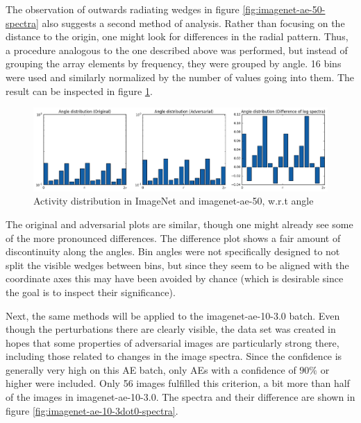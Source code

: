 \documentclass[11pt, a4paper]{article}
\begin{document}
The observation of outwards radiating wedges in figure \ref{fig:imagenet-ae-50-spectra} also suggests a second method of analysis. Rather than focusing on the distance to the origin, one might look for differences in the radial pattern. Thus, a procedure analogous to the one described above was performed, but instead of grouping the array elements by frequency, they were grouped by angle. 16 bins were used and similarly normalized by the number of values going into them. The result can be inspected in figure \ref{fig:imagenet-ae-50-angle}.

\begin{figure}[h!tb]
	\centering
	\includegraphics[width=\textwidth]{images/spectra/imagenet-ae-50-minconfidence-0dot5-maxorig-20000-angle-16-bins.png}
	\caption[Log spectra of ImageNet and adversarial examples, angular analysis]{Activity distribution in ImageNet and imagenet-ae-50, w.r.t angle}
	\label{fig:imagenet-ae-50-angle}
\end{figure}

The original and adversarial plots are similar, though one might already see some of the more pronounced differences. The difference plot shows a fair amount of discontinuity along the angles. Bin angles were not specifically designed to not split the visible wedges between bins, but since they seem to be aligned with the coordinate axes this may have been avoided by chance (which is desirable since the goal is to inspect their significance).


Next, the same methods will be applied to the imagenet-ae-10-3.0 batch. Even though the perturbations there are clearly visible, the data set was created in hopes that some properties of adversarial images are particularly strong there, including those related to changes in the image spectra. Since the confidence is generally very high on this AE batch, only AEs with a confidence of $90\%$ or higher were included. Only 56 images fulfilled this criterion, a bit more than half of the images in imagenet-ae-10-3.0. The spectra and their difference are shown in figure \ref{fig:imagenet-ae-10-3dot0-spectra}.
\end{document}
